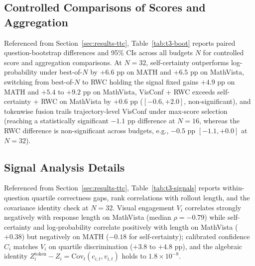 \documentclass{article}
\begin{document}
\subsection{Controlled Comparisons of Scores and Aggregation}
\label{app:ttc-bootstrap}
Referenced from Section~\ref{sec:results-ttc}, Table~\ref{tab:t3-boot} reports paired question-bootstrap differences and 95\% CIs across all budgets $N$ for controlled score and aggregation comparisons. At $N=32$, self-certainty outperforms log-probability under best-of-$N$ by $+6.6$ pp on MATH and $+6.5$ pp on MathVista, switching from best-of-$N$ to RWC holding the signal fixed gains $+4.9$ pp on MATH and $+5.4$ to $+9.2$ pp on MathVista, VisConf + RWC exceeds self-certainty + RWC on MathVista by $+0.6$ pp ($[-0.6, +2.0]$, non-significant), and tokenwise fusion trails trajectory-level VisConf under max-score selection (reaching a statistically significant $-1.1$ pp difference at $N=16$, whereas the RWC difference is non-significant across budgets, e.g., $-0.5$ pp $[-1.1, +0.0]$ at $N=32$).


\subsection{Signal Analysis Details}
\label{app:ttc-signals}
Referenced from Section~\ref{sec:results-ttc}, Table~\ref{tab:t3-signals} reports within-question quartile correctness gaps, rank correlations with rollout length, and the covariance identity check at $N=32$. Visual engagement $V_i$ correlates strongly negatively with response length on MathVista (median $\rho = -0.79$) while self-certainty and log-probability correlate positively with length on MathVista ($+0.38$) but negatively on MATH ($-0.18$ for self-certainty); calibrated confidence $C_i$ matches $V_i$ on quartile discrimination ($+3.8$ to $+4.8$ pp), and the algebraic identity $Z_i^{\text{token}} - Z_i = \text{Cov}_t(c_{i,t}, v_{i,t})$ holds to $1.8\times 10^{-8}$.

\end{document}
